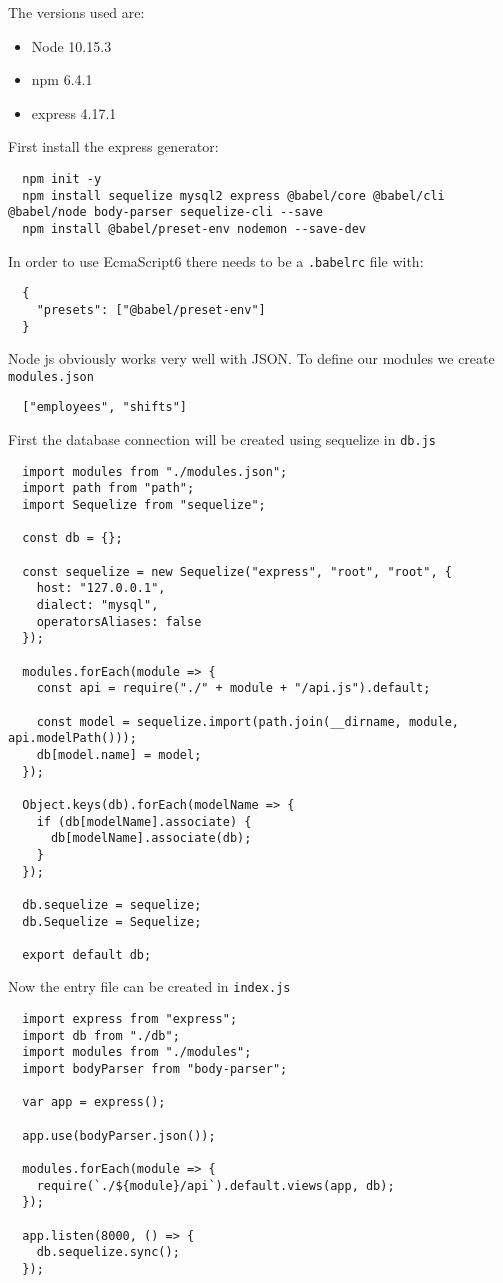 The versions used are:
\begin{itemize}
  \item Node 10.15.3
  \item npm 6.4.1
  \item express 4.17.1
\end{itemize}

First install the express generator:
\begin{verbatim}
  npm init -y
  npm install sequelize mysql2 express @babel/core @babel/cli @babel/node body-parser sequelize-cli --save
  npm install @babel/preset-env nodemon --save-dev
\end{verbatim}

In order to use EcmaScript6 there needs to be a \texttt{.babelrc} file with:
\begin{verbatim}
  {
    "presets": ["@babel/preset-env"]
  }
\end{verbatim}

Node js obviously works very well with JSON. To define our modules we create \texttt{modules.json}
\begin{verbatim}
  ["employees", "shifts"]
\end{verbatim}

First the database connection will be created using sequelize in \texttt{db.js}
\begin{verbatim}
  import modules from "./modules.json";
  import path from "path";
  import Sequelize from "sequelize";

  const db = {};

  const sequelize = new Sequelize("express", "root", "root", {
    host: "127.0.0.1",
    dialect: "mysql",
    operatorsAliases: false
  });

  modules.forEach(module => {
    const api = require("./" + module + "/api.js").default;

    const model = sequelize.import(path.join(__dirname, module, api.modelPath()));
    db[model.name] = model;
  });

  Object.keys(db).forEach(modelName => {
    if (db[modelName].associate) {
      db[modelName].associate(db);
    }
  });

  db.sequelize = sequelize;
  db.Sequelize = Sequelize;

  export default db;
\end{verbatim}

Now the entry file can be created in \texttt{index.js}
\begin{verbatim}
  import express from "express";
  import db from "./db";
  import modules from "./modules";
  import bodyParser from "body-parser";

  var app = express();

  app.use(bodyParser.json());

  modules.forEach(module => {
    require(`./${module}/api`).default.views(app, db);
  });

  app.listen(8000, () => {
    db.sequelize.sync();
  });
\end{verbatim}

